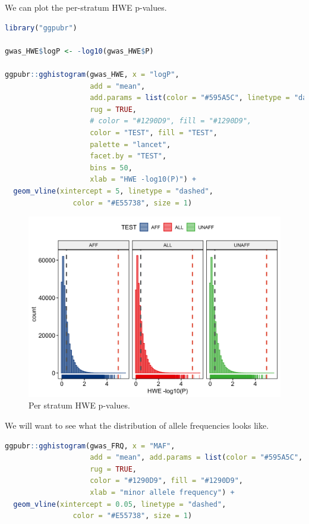 \documentclass[
]{book}
\begin{document}
We can plot the per-stratum HWE p-values.

\begin{lstlisting}[language=R]
library("ggpubr")

gwas_HWE$logP <- -log10(gwas_HWE$P)

ggpubr::gghistogram(gwas_HWE, x = "logP",
                    add = "mean",
                    add.params = list(color = "#595A5C", linetype = "dashed", size = 1),
                    rug = TRUE,
                    # color = "#1290D9", fill = "#1290D9",
                    color = "TEST", fill = "TEST",
                    palette = "lancet",
                    facet.by = "TEST",
                    bins = 50,
                    xlab = "HWE -log10(P)") +
  geom_vline(xintercept = 5, linetype = "dashed",
                color = "#E55738", size = 1)
\end{lstlisting}

\begin{figure}

{\centering \includegraphics[width=18.67in]{img/_gwas/show-hwe-gwas} 

}

\caption{Per stratum HWE p-values.}\label{fig:show-hwe-gwas}
\end{figure}

We will want to see what the distribution of allele frequencies looks like.

\begin{lstlisting}[language=R]
ggpubr::gghistogram(gwas_FRQ, x = "MAF",
                    add = "mean", add.params = list(color = "#595A5C", linetype = "dashed", size = 1),
                    rug = TRUE,
                    color = "#1290D9", fill = "#1290D9",
                    xlab = "minor allele frequency") +
  geom_vline(xintercept = 0.05, linetype = "dashed",
                color = "#E55738", size = 1)
\end{lstlisting}
\end{document}
